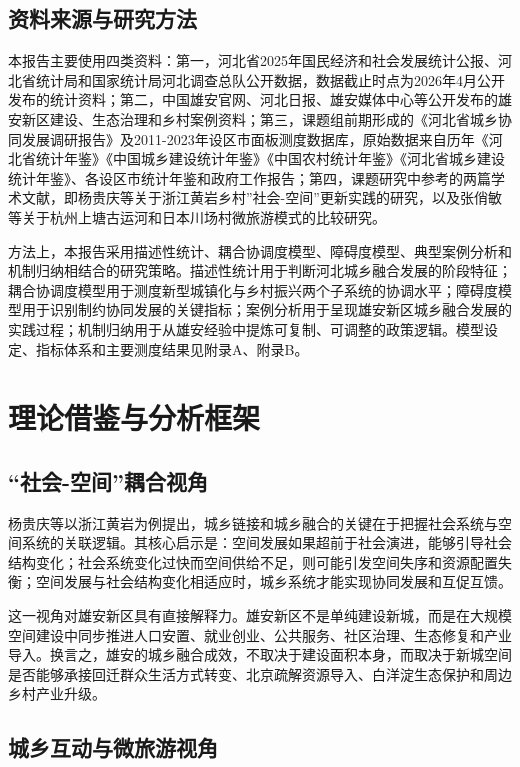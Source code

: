 \documentclass[UTF8,zihao=-4]{ctexart}
\begin{document}
\subsection{资料来源与研究方法}

本报告主要使用四类资料：第一，河北省2025年国民经济和社会发展统计公报、河北省统计局和国家统计局河北调查总队公开数据，数据截止时点为2026年4月公开发布的统计资料；第二，中国雄安官网、河北日报、雄安媒体中心等公开发布的雄安新区建设、生态治理和乡村案例资料；第三，课题组前期形成的《河北省城乡协同发展调研报告》及2011-2023年设区市面板测度数据库，原始数据来自历年《河北省统计年鉴》《中国城乡建设统计年鉴》《中国农村统计年鉴》《河北省城乡建设统计年鉴》、各设区市统计年鉴和政府工作报告；第四，课题研究中参考的两篇学术文献，即杨贵庆等关于浙江黄岩乡村”社会-空间”更新实践的研究，以及张俏敏等关于杭州上塘古运河和日本川场村微旅游模式的比较研究。

方法上，本报告采用描述性统计、耦合协调度模型、障碍度模型、典型案例分析和机制归纳相结合的研究策略。描述性统计用于判断河北城乡融合发展的阶段特征；耦合协调度模型用于测度新型城镇化与乡村振兴两个子系统的协调水平；障碍度模型用于识别制约协同发展的关键指标；案例分析用于呈现雄安新区城乡融合发展的实践过程；机制归纳用于从雄安经验中提炼可复制、可调整的政策逻辑。模型设定、指标体系和主要测度结果见附录A、附录B。

\section{理论借鉴与分析框架}

\subsection{“社会-空间”耦合视角}

杨贵庆等以浙江黄岩为例提出，城乡链接和城乡融合的关键在于把握社会系统与空间系统的关联逻辑。其核心启示是：空间发展如果超前于社会演进，能够引导社会结构变化；社会系统变化过快而空间供给不足，则可能引发空间失序和资源配置失衡；空间发展与社会结构变化相适应时，城乡系统才能实现协同发展和互促互馈。

这一视角对雄安新区具有直接解释力。雄安新区不是单纯建设新城，而是在大规模空间建设中同步推进人口安置、就业创业、公共服务、社区治理、生态修复和产业导入。换言之，雄安的城乡融合成效，不取决于建设面积本身，而取决于新城空间是否能够承接回迁群众生活方式转变、北京疏解资源导入、白洋淀生态保护和周边乡村产业升级。

\subsection{城乡互动与微旅游视角}
\end{document}
